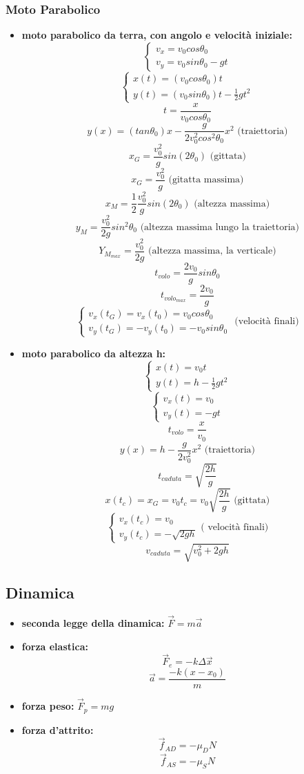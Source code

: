 \documentclass[a4paper,12pt, oneside]{book}
\begin{document}
\subsubsection{Moto Parabolico}
\begin{itemize}
\item \textbf{moto parabolico da terra, con angolo e velocità iniziale:}
$$
\begin{cases}
v_x=v_0cos\theta_0\\
v_y=v_0sin\theta_0-gt
\end{cases}
$$
$$\begin{cases}
x(t)=(v_0cos\theta_0)t\\
y(t)=(v_0sin\theta_0)t-\frac{1}{2}gt^2
\end{cases}$$
$$t=\frac{x}{v_0cos\theta_0}$$
$$y(x)=(tan\theta_0)x-\frac{g}{2v_0^2cos^2\theta_0}x^2\mbox{ (traiettoria)}$$
$$x_G=\frac{v_0^2}{g}sin(2\theta_0)\mbox{ (gittata)}$$
$$x_G=\frac{v_0^2}{g}\mbox{ (gitatta massima)}$$
$$x_M=\frac{1}{2}\frac{v_0^2}{g}sin(2\theta_0)\mbox{ (altezza massima)}$$
$$y_M=\frac{v_0^2}{2g}sin^2\theta_0 \mbox{ (altezza massima lungo la traiettoria)}$$
$$Y_{M_{max}}=\frac{v_0^2}{2g}\mbox{ (altezza massima, la verticale)}$$
$$t_{volo}=\frac{2v_0}{g}sin\theta_0$$
$$t_{{volo}_{max}}=\frac{2v_0}{g}$$
$$\begin{cases}
v_x(t_G)=v_x(t_0)=v_0cos\theta_0\\
v_y(t_G)=-v_y(t_0)=-v_0sin\theta_0
\end{cases}\mbox{ (velocità finali)}$$
\item \textbf{moto parabolico da altezza h:}
$$\begin{cases}
x(t)=v_0t\\
y(t)=h-\frac{1}{2}gt^2
\end{cases}$$
$$\begin{cases}
v_x(t)=v_0\\
v_y(t)=-gt
\end{cases}$$
$$t_{volo}=\frac{x}{v_0}$$
$$y(x)=h-\frac{g}{2v_0^2}x^2\mbox{ (traiettoria)}$$
$$t_{caduta}=\sqrt{\frac{2h}{g}}$$
$$x(t_c)=x_G=v_0t_c=v_0\sqrt{\frac{2h}{g}}\mbox{ (gittata)}$$
$$\begin{cases}v_x(t_c)=v_0\\
v_y(t_c)=-\sqrt{2gh}\end{cases} \mbox{( velocità finali)}$$
$$v_{caduta}=\sqrt{v_0^2+2gh}$$
\end{itemize}
\subsection{Dinamica}
\begin{itemize}
\item \textbf{seconda legge della dinamica:} $\vec{F}=m\vec{a}$
\item \textbf{forza elastica:}
$$\vec{F}_e=-k\Delta \vec{x}$$
$$\vec{a}=\frac{-k(x-x_0)}{m}$$
\item \textbf{forza peso:}
$\vec{F}_p=mg$
\item \textbf{forza d'attrito:}
$$\vec{f}_{AD}=-\mu_DN$$
$$\vec{f}_{AS}=-\mu_SN$$
\end{itemize}
\end{document}
